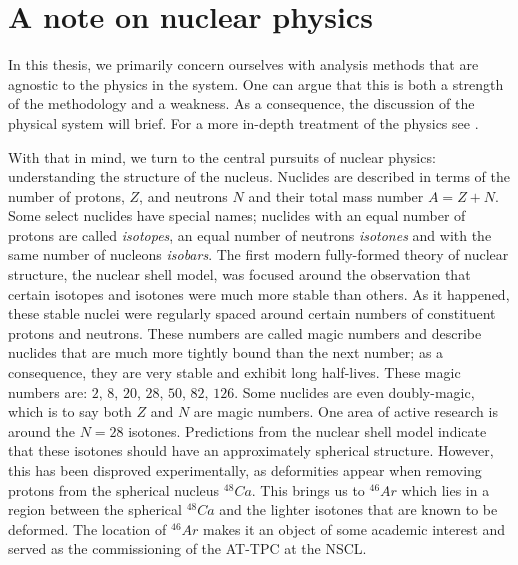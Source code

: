 

\section{A note on nuclear physics}

In this thesis, we primarily concern ourselves with analysis methods that are agnostic to the physics in the system. One can argue that this is both a strength of the methodology and a weakness. As a consequence, the discussion of the physical system will brief. For a more in-depth treatment of the physics see \cite{Bradt2017}. 

With that in mind, we turn to the central pursuits of nuclear physics: understanding the structure of the nucleus. Nuclides are described in terms of the number of protons, $Z$, and neutrons $N$ and their total mass number $A = Z +N$. Some select nuclides have special names; nuclides with an equal number of protons are called \textit{isotopes}, an equal number of neutrons \textit{isotones} and with the same number of nucleons \textit{isobars}. The first modern fully-formed theory of nuclear structure, the nuclear shell model, was focused around the observation that certain isotopes and isotones were much more stable than others. As it happened, these stable nuclei were regularly spaced around certain numbers of constituent protons and neutrons. These numbers are called magic numbers and describe nuclides that are much more tightly bound than the next number; as a consequence, they are very stable and exhibit long half-lives. These magic numbers are: $2 ,\, 8 ,\, 20 ,\, 28 ,\, 50 ,\, 82 ,\, 126$. Some nuclides are even doubly-magic, which is to say both $Z$ and $N$ are magic numbers. One area of active research is around the $N=28$ isotones. Predictions from the nuclear shell model indicate that these isotones should have an approximately spherical structure. However, this has been disproved experimentally, as deformities appear when removing protons from the spherical nucleus ${}^{48}Ca$. This brings us to ${}^{46}Ar$ which lies in a region between the spherical ${}^{48}Ca$ and the lighter isotones that are known to be deformed. The location of ${}^{46}Ar$ makes it an object of some academic interest and served as the commissioning of the AT-TPC at the NSCL. 


